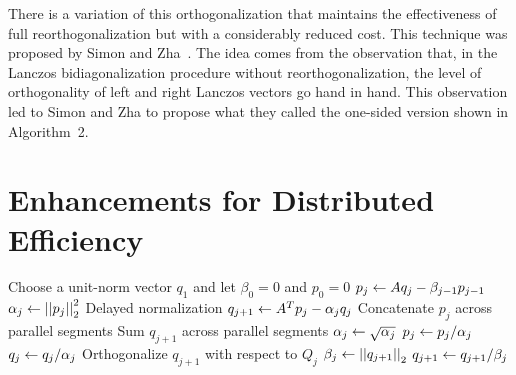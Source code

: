 There is a variation of this orthogonalization that maintains the effectiveness
of full reorthogonalization but with a considerably reduced cost. This technique
was proposed by Simon and Zha~\cite{simon2000}. The idea comes from the observation that,
in the Lanczos bidiagonalization procedure without reorthogonalization, the
level of orthogonality of left and right Lanczos vectors go hand in hand. This
observation led to Simon and Zha to propose what they called the one-sided version
shown in Algorithm~2. %

\section{Enhancements for Distributed Efficiency} %
\label{sec:parallelizing}

\begin{algorithm}%
\begin{algorithmic}[1]
     \State Choose a unit-norm vector $q_1$ and let $\beta_0 = 0$ and $p_0 = 0$
        \State $p_j \leftarrow Aq_j - \beta_{j-1} p_{j-1}$
        \State $\alpha_j \leftarrow \left|\left|p_j\right|\right|_2^2$   \Comment Delayed normalization
        \State $q_{j+1} \leftarrow A^Tp_j - \alpha_j q_j$
        \State Concatenate $p_j$ across parallel segments
        \State Sum $q_{j+1}$ across parallel segments
        \State $\alpha_j \leftarrow \sqrt{\alpha_j}$
        \State $p_j \leftarrow p_j/\alpha_j$
        \State $q_j \leftarrow q_j/\alpha_j$
        \State Orthogonalize $q_{j+1}$ with respect to $Q_j$
        \State $\beta_j \leftarrow \left|\left|q_{j+1}\right|\right|_2$
        \State $q_{j+1} \leftarrow q_{j+1}/\beta_j$
    \EndFor
\end{algorithmic}
\end{algorithm}

